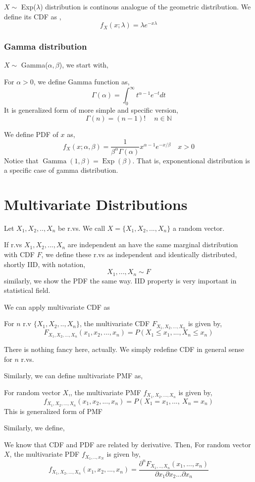 $X \sim$ Exp($\lambda$) distribution is continous analogue of the geometric distribution.
We define its CDF as ,
\[f_X(x; \lambda) = \lambda e^{-x \lambda}\]
\subsubsection*{Gamma distribution}
$X \sim$ Gamma($\alpha,\beta$), we start with,
\begin{definition}
    For $\alpha > 0$, we define \alert{Gamma function} as,
    \[\Gamma(\alpha) = \int_{0}^{\infty} t^{\alpha-1} e^{-t}dt\]
    It is generalized form of more simple and specific version,
    \[ \Gamma(n) = (n-1)! \quad  \ n \in \mathbb{N} \]
\end{definition}
We define PDF of $x$ as,
\[f_X(x; \alpha, \beta) =  \frac{1}{\beta^{\alpha} \Gamma(\alpha)} x^{\alpha-1} e^{-x/ \beta} \quad x > 0\]
Notice that $\operatorname{Gamma}(1, \beta) =\operatorname{Exp}( \beta)$. That is, exponentional distribution is a specific case of gamma
distribution.

\section{Multivariate Distributions}
\begin{definition}
    Let $X_1,X_2,..,X_n$ be r.vs. We call $X = \{ X_1, X_2, ... ,X_n\}$ \alert{a random vector}.
\end{definition}
\begin{definition}
    If r.vs $X_1,X_2,...,X_n$ are independent an have the same marginal distribution with CDF $F$, we define these r.vs
    as \alert{independent and identically distributed}, shortly IID, with notation,
    \[X_1,...,X_n \sim F\]
    similarly, we show the PDF the same way. IID property is very important in statistical field.
\end{definition}
We can apply multivariate CDF as
\begin{definition}
    For $n$  r.v $\{ X_1,X_2,..,X_n \}$, the multivariate CDF $F_{X_1,X_2,...,X_n}$ is given by,
    \[F_{X_1,X_2,...,X_n}(x_1,x_2,...,x_n) = P(X_1 \le x_1,...,X_n \le x_n) \]
\end{definition}
There is nothing fancy here, actually. We simply redefine CDF in general sense for $n$ r.vs.
\par
Similarly, we can define multivariate PMF as,
\begin{definition} For random vector $X$,, the multivariate PMF  $f_{X_1,X_2,...,X_n}$ is given by,
    \[ f_{X_1,X_2,...,X_n}(x_1,x_2,...,x_n) = P(X_1=x_1 ,...,  \ X_n = x_n) \]
    This is generalized form of PMF

\end{definition}
Similarly, we define,
\begin{definition}
    We know that CDF and PDF are related by derivative. Then,
    For random vector $X$, the multivariate PDF $f_{X_1,..,x_N}$ is given by,
    \[f_{X_1,X_2,...,X_n}(x_1,x_2,...,x_n) = \frac{{\partial}^nF_{X_1,..,X_n}(x_1,...,x_n)}{\partial x_1\partial x_2...\partial x_n}\]
\end{definition}


